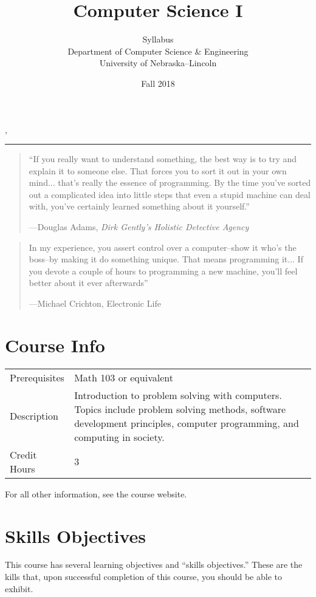 \documentclass[12pt]{scrartcl}
\title{Computer Science I}\let\Title\@title
\subtitle{Syllabus\\
{\small
\vskip1cm
Department of Computer Science \& Engineering \\
University of Nebraska--Lincoln}
\vskip-1cm}
\date{Fall 2018}
\begin{document}
\maketitle

\newwatermark[allpages=true,scale=5,textmark=Draft]{},

\hrule

\begin{quote}
``If you really want to understand something, the best way is to try and explain it to someone else. That forces you to sort it out in your own mind... that's really the essence of programming. By the time you've sorted out a complicated idea into little steps that even a stupid machine can deal with, you've certainly learned something about it yourself.'' 

\hfill ---Douglas Adams, \emph{Dirk Gently's Holistic Detective Agency}
\end{quote}

\begin{quote}
In my experience, you assert control over a computer--show it who's the boss--by making it do something unique. That means programming it... If you devote a couple of hours to programming a new machine, you'll feel better about it ever afterwards'' 

\hfill ---Michael Crichton, Electronic Life
\end{quote}

\section{Course Info}

\begin{tabular}{lp{10cm}}
Prerequisites & Math 103 or equivalent \\
Description  & Introduction to problem solving with computers. 
Topics include problem solving methods, software development 
principles, computer programming, and computing in society.\\
Credit Hours & 3\\
\end{tabular}

For all other information, see the course website.

\section{Skills Objectives}

This course has several learning objectives and ``skills objectives.''
These are the kills that, upon successful completion of this course, 
you should be able to exhibit.
\end{document}
